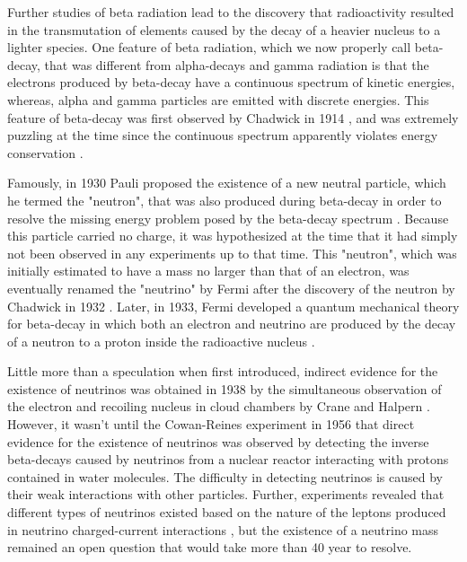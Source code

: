 Further studies of beta radiation lead to the discovery that radioactivity resulted in the transmutation of elements \cite{rutherford_transmutation} caused by the decay of a heavier nucleus to a lighter species. One feature of beta radiation, which we now properly call beta-decay, that was different from alpha-decays and gamma radiation is that the electrons produced by beta-decay have a continuous spectrum of kinetic energies, whereas, alpha and gamma particles are emitted with discrete energies. This feature of beta-decay was first observed by Chadwick in 1914 \cite{chadwick1914}, and was extremely puzzling at the time since the continuous spectrum apparently violates energy conservation \cite{bohr_energy_nonconservation_ref}. 

Famously, in 1930 Pauli proposed the existence of a new neutral particle, which he termed the "neutron", that was also produced during beta-decay in order to resolve the missing energy problem posed by the beta-decay spectrum \cite{Pauli:1930pc}. Because this particle carried no charge, it was hypothesized at the time that it had simply not been observed in any experiments up to that time. This "neutron", which was initially estimated to have a mass no larger than that of an electron, was eventually renamed the "neutrino" by Fermi \cite{fermi_rename} after the discovery of the neutron by Chadwick in 1932 \cite{neutron}. Later, in 1933, Fermi developed a quantum mechanical theory for beta-decay in which both an electron and neutrino are produced by the decay of a neutron to a proton inside the radioactive nucleus \cite{fermi_beta_decay}.

Little more than a speculation when first introduced, indirect evidence for the existence of neutrinos was obtained in 1938 by the simultaneous observation of the electron and recoiling nucleus in cloud chambers by Crane and Halpern \cite{crane_halpern}. However, it wasn't until the Cowan-Reines experiment \cite{cowan_reines} in 1956 that direct evidence for the existence of neutrinos was observed by detecting the inverse beta-decays caused by neutrinos from a nuclear reactor interacting with protons contained in water molecules. The difficulty in detecting neutrinos is caused by their weak interactions with other particles. Further, experiments revealed that different types of neutrinos existed based on the nature of the leptons produced in neutrino charged-current interactions \cite{neutrino_flavor}, but the existence of a neutrino mass remained an open question that would take more than 40 year to resolve.

